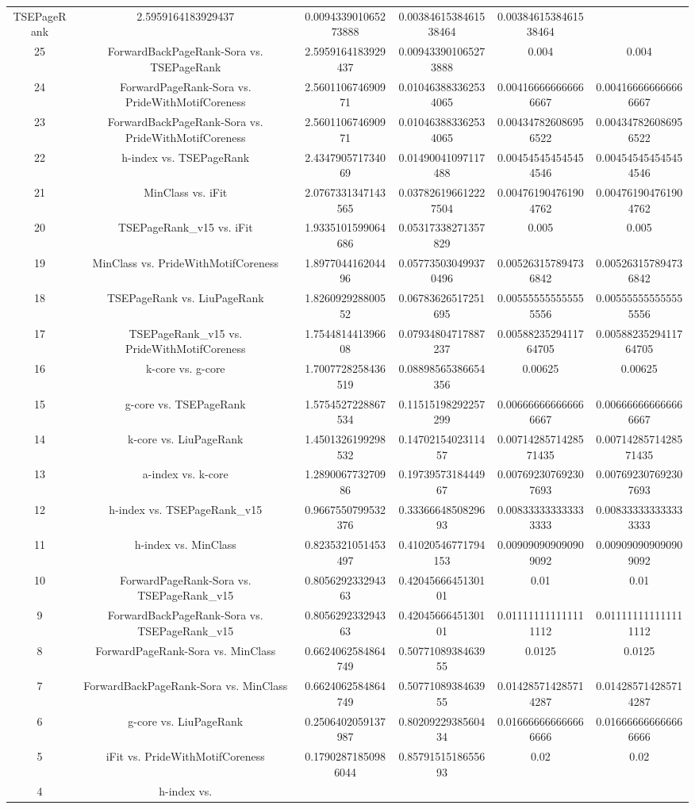 \documentclass[a4paper,10pt]{article}
\begin{document}
\begin{landscape}
\begin{table}[!htp]
\begin{tabular}{cccccc}
TSEPageRank&2.5959164183929437&0.009433901065273888&0.0038461538461538464&0.0038461538461538464\\25&ForwardBackPageRank-Sora vs. TSEPageRank&2.5959164183929437&0.009433901065273888&0.004&0.004\\24&ForwardPageRank-Sora vs. PrideWithMotifCoreness&2.560110674690971&0.010463883362534065&0.004166666666666667&0.004166666666666667\\23&ForwardBackPageRank-Sora vs. PrideWithMotifCoreness&2.560110674690971&0.010463883362534065&0.004347826086956522&0.004347826086956522\\22&h-index vs. TSEPageRank&2.434790571734069&0.01490041097117488&0.004545454545454546&0.004545454545454546\\21&MinClass vs. iFit&2.0767331347143565&0.037826196612227504&0.004761904761904762&0.004761904761904762\\20&TSEPageRank_v15 vs. iFit&1.9335101599064686&0.05317338271357829&0.005&0.005\\19&MinClass vs. PrideWithMotifCoreness&1.897704416204496&0.057735030499370496&0.005263157894736842&0.005263157894736842\\18&TSEPageRank vs. LiuPageRank&1.826092928800552&0.06783626517251695&0.005555555555555556&0.005555555555555556\\17&TSEPageRank_v15 vs. PrideWithMotifCoreness&1.754481441396608&0.07934804717887237&0.0058823529411764705&0.0058823529411764705\\16&k-core vs. g-core&1.7007728258436519&0.08898565386654356&0.00625&0.00625\\15&g-core vs. TSEPageRank&1.5754527228867534&0.11515198292257299&0.006666666666666667&0.006666666666666667\\14&k-core vs. LiuPageRank&1.4501326199298532&0.1470215402311457&0.0071428571428571435&0.0071428571428571435\\13&a-index vs. k-core&1.289006773270986&0.1973957318444967&0.007692307692307693&0.007692307692307693\\12&h-index vs. TSEPageRank_v15&0.9667550799532376&0.3336664850829693&0.008333333333333333&0.008333333333333333\\11&h-index vs. MinClass&0.8235321051453497&0.41020546771794153&0.009090909090909092&0.009090909090909092\\10&ForwardPageRank-Sora vs. TSEPageRank_v15&0.805629233294363&0.4204566645130101&0.01&0.01\\9&ForwardBackPageRank-Sora vs. TSEPageRank_v15&0.805629233294363&0.4204566645130101&0.011111111111111112&0.011111111111111112\\8&ForwardPageRank-Sora vs. MinClass&0.6624062584864749&0.5077108938463955&0.0125&0.0125\\7&ForwardBackPageRank-Sora vs. MinClass&0.6624062584864749&0.5077108938463955&0.014285714285714287&0.014285714285714287\\6&g-core vs. LiuPageRank&0.2506402059137987&0.8020922938560434&0.016666666666666666&0.016666666666666666\\5&iFit vs. PrideWithMotifCoreness&0.17902871850986044&0.8579151518655693&0.02&0.02\\4&h-index vs. 
\end{tabular}
\end{table}
\end{landscape}
\end{document}

